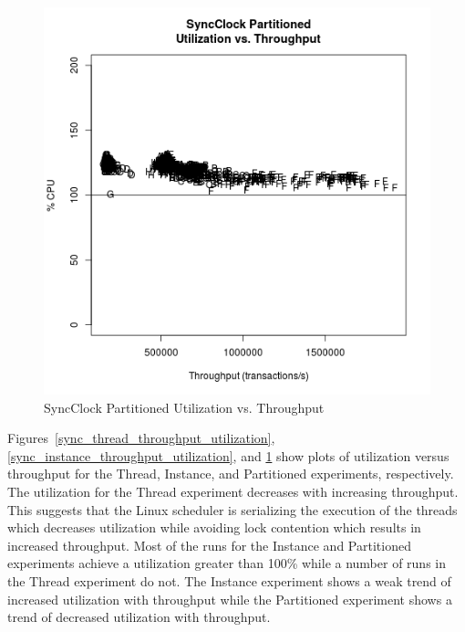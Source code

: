 \begin{figure}[H]
\center
\includegraphics[height=.4\textheight]{sync_partitioned_throughput_utilization.png}
\caption{SyncClock Partitioned Utilization vs. Throughput}
\label{sync_partitioned_throughput_utilization}
\end{figure}

Figures~\ref{sync_thread_throughput_utilization}, \ref{sync_instance_throughput_utilization}, and \ref{sync_partitioned_throughput_utilization} show plots of utilization versus throughput for the Thread, Instance, and Partitioned experiments, respectively.
The utilization for the Thread experiment decreases with increasing throughput.
This suggests that the Linux scheduler is serializing the execution of the threads which decreases utilization while avoiding lock contention which results in increased throughput.
Most of the runs for the Instance and Partitioned experiments achieve a utilization greater than 100\% while a number of runs in the Thread experiment do not.
The Instance experiment shows a weak trend of increased utilization with throughput while the Partitioned experiment shows a trend of decreased utilization with throughput.

